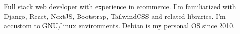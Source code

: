 


\begin{cvpubs}

  \cvpub
    {
      \begin{cvlist}
  \item { Full stack web developer with experience in ecommerce. I'm familiarized with Django, React, NextJS, Bootstrap, TailwindCSS and related libraries. I'm accustom to GNU/linux environments. Debian is my personal OS since 2010. }
      \end{cvlist}
    }\vspace{-15pt}
\end{cvpubs}
